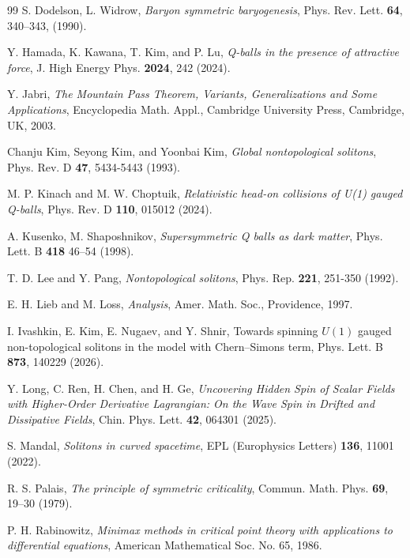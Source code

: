 \documentclass[12pt]{article}
\begin{document}
{\begin{thebibliography}{99}
		S. Dodelson, L. Widrow, \textit{Baryon symmetric baryogenesis}, Phys. Rev. Lett. \textbf{64}, 340–343, (1990).

		Y. Hamada, K. Kawana, T. Kim, and P. Lu, \textit{Q-balls in the presence of attractive force}, J. High Energy Phys. \textbf{2024}, 242 (2024).
		
		Y. Jabri, {\em The Mountain Pass Theorem, Variants, Generalizations and Some Applications}, Encyclopedia Math. Appl., Cambridge University Press, Cambridge, UK, 2003.
		
		Chanju Kim, Seyong Kim, and Yoonbai Kim, \textit{Global nontopological solitons}, Phys. Rev. D \textbf{47}, 5434-5443 (1993).

		M. P. Kinach and M. W. Choptuik, \textit{Relativistic head-on collisions of U(1) gauged Q-balls}, Phys. Rev. D \textbf{110}, 015012 (2024).
		
		A. Kusenko, M. Shaposhnikov, \textit{Supersymmetric Q balls as dark matter}, Phys. Lett. B \textbf{418}
		46–54 (1998).
		
		T. D. Lee and Y. Pang, \textit{Nontopological solitons}, Phys. Rep. \textbf{221}, 251-350 (1992).
		
		E. H. Lieb and M. Loss, \emph{Analysis}, Amer. Math. Soc., Providence, 1997.


        I. Ivashkin, E. Kim, E. Nugaev, and Y. Shnir, Towards spinning $U(1)$ gauged non-topological solitons in the model with Chern--Simons term, Phys. Lett. B \textbf{873}, 140229 (2026).

		Y. Long, C. Ren, H. Chen, and H. Ge, \textit{Uncovering Hidden Spin of Scalar Fields with Higher-Order Derivative Lagrangian: On the Wave Spin in Drifted and Dissipative Fields}, Chin. Phys. Lett. \textbf{42}, 064301 (2025).

		S. Mandal, \textit{Solitons in curved spacetime}, EPL (Europhysics Letters) \textbf{136}, 11001 (2022).

		 R. S. Palais, \textit{The principle of symmetric criticality}, Commun. Math. Phys. \textbf{69}, 19–30 (1979).
		
		P. H. Rabinowitz, \textit{Minimax methods in critical point theory with applications to differential equations}, American Mathematical Soc. No. 65, 1986.
		

\end{thebibliography}}
\end{document}
